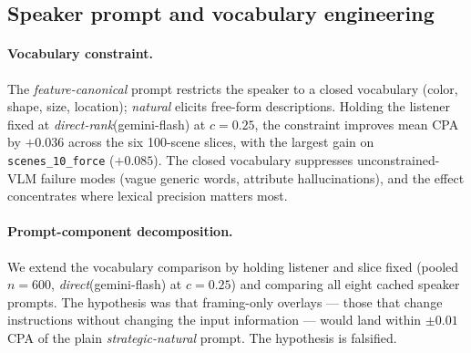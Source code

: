 \documentclass[11pt]{article}
\begin{document}
\subsection{Speaker prompt and vocabulary engineering}
\label{app:a7}

\paragraph{Vocabulary constraint.} The
\textit{feature-canonical} prompt restricts the speaker to a closed
vocabulary (color, shape, size, location); \textit{natural} elicits
free-form descriptions. Holding the listener fixed at
\textit{direct-rank}(gemini-flash) at $c{=}0.25$, the constraint
improves mean CPA by $+0.036$ across the six 100-scene slices, with
the largest gain on \texttt{scenes\_10\_force} ($+0.085$). The closed
vocabulary suppresses unconstrained-VLM failure modes (vague generic
words, attribute hallucinations), and the effect concentrates where
lexical precision matters most. 

\paragraph{Prompt-component decomposition.} We extend the vocabulary
comparison by holding listener and slice fixed (pooled $n{=}600$,
\textit{direct}(gemini-flash) at $c{=}0.25$) and comparing all eight
cached speaker prompts. The hypothesis was that framing-only overlays
--- those that change instructions without changing the input
information --- would land within $\pm 0.01$ CPA of the plain
\textit{strategic-natural} prompt. The hypothesis is falsified.
\end{document}
